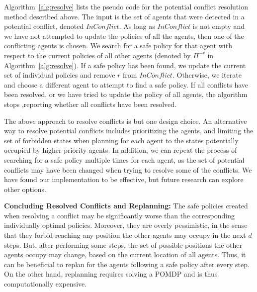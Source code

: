 \documentclass[letterpaper]{article} %
\newcommand{\inconflict}{\textit{InConflict}}
\newcommand{\roni}[1]{ }
\begin{document}
Algorithm~\ref{alg:resolve} lists the pseudo code for the potential conflict resolution method described above. 
The input is the set of agents that were detected in a potential conflict, denoted $\inconflict$. 
As long as $\inconflict$ is not empty and we have not attempted to update the policies of all the agents, 
then one of the conflicting agents is chosen. 
We search for a safe policy for that agent with respect to the current policies of all other agents (denoted by $\Pi^{-r}$ in Algorithm~\ref{alg:resolve}). 
If a safe policy has been found, we update the current set of individual policies and remove $r$ from $\inconflict$. 
Otherwise, we iterate and choose a different agent to attempt to find a safe policy. 
If all conflicts have been resolved, or we have tried to update the policy of all agents, the algorithm stops ,reporting whether all conflicts have been resolved. 
\roni{If space is an issue, consider removing the above paragraph and pseudo-code}





The above approach to resolve conflicts is but one design choice. 
An alternative way to resolve potential conflicts includes prioritizing the agents, and limiting the set of forbidden states when planning for each agent to the states potentially occupied by higher-priority agents. In addition, we can repeat the process of searching for a safe policy multiple times for each agent, as the set of potential conflicts may have been changed when trying to resolve some of the conflicts. We have found our implementation to be effective, but future research can explore other options. 


\noindent\textbf{Concluding Resolved Conflicts and Replanning:} 
The safe policies created when resolving a conflict may be significantly worse than the corresponding individually optimal policies. Moreover, they are overly pessimistic, in the sense that they forbid reaching any position the other agents may occupy in the next $d$ steps. But, after performing some steps, the set of possible positions the other agents occupy may change, based on the current location of all agents. Thus, it can be beneficial to replan for the agents following a safe policy after every step. On the other hand, replanning requires solving a POMDP and is thus computationally expensive. 
\end{document}
